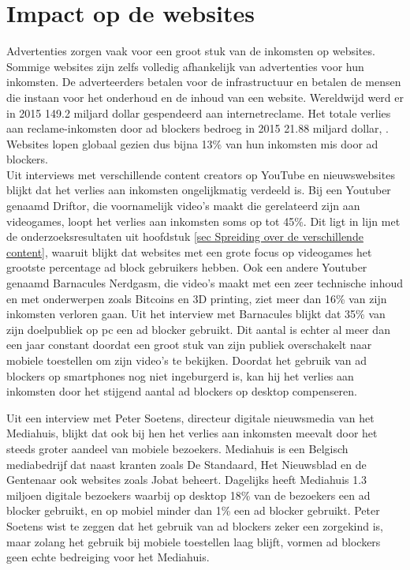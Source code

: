 \documentclass[pdftex,a4paper,12pt,twoside]{report}
\begin{document}
\section{Impact op de websites}
\label{sec:Impact op de webpagina's}
Advertenties zorgen vaak voor een groot stuk van de inkomsten op websites. Sommige websites zijn zelfs volledig afhankelijk van advertenties voor hun inkomsten. De adverteerders betalen voor de infrastructuur en betalen de mensen die instaan voor het onderhoud en de inhoud van een website. Wereldwijd werd er in 2015 149.2 miljard dollar gespendeerd aan internetreclame. Het totale verlies aan reclame-inkomsten door ad blockers bedroeg in 2015 21.88 miljard dollar, \cite{PageFair2015}. Websites lopen globaal gezien dus bijna 13\% van hun inkomsten mis door ad blockers. 
\\
Uit interviews met verschillende content creators op YouTube en nieuwswebsites blijkt dat het verlies aan inkomsten ongelijkmatig verdeeld is. Bij een Youtuber genaamd Driftor, die voornamelijk video's maakt die gerelateerd zijn aan videogames, loopt het verlies aan inkomsten soms op tot 45\%. Dit ligt in lijn met de onderzoeksresultaten uit hoofdstuk \ref{sec Spreiding over de verschillende content}, waaruit blijkt dat websites met een grote focus op videogames het grootste percentage ad block gebruikers hebben. 
Ook een andere Youtuber genaamd Barnacules Nerdgasm, die video's maakt met een zeer technische inhoud en met onderwerpen zoals Bitcoins en 3D printing, ziet meer dan 16\% van zijn inkomsten verloren gaan. Uit het interview met Barnacules blijkt dat 35\% van zijn doelpubliek op pc een ad blocker gebruikt. Dit aantal  is echter al meer dan een jaar constant doordat een groot stuk van zijn publiek overschakelt naar mobiele toestellen om zijn video's te bekijken. Doordat het gebruik van ad blockers op smartphones nog niet ingeburgerd is, kan hij het verlies aan inkomsten door het stijgend aantal ad blockers op desktop compenseren.

Uit een interview met Peter Soetens, directeur digitale nieuwsmedia van het Mediahuis, blijkt dat ook bij hen het verlies aan inkomsten meevalt door het steeds groter aandeel van mobiele bezoekers. Mediahuis is een Belgisch mediabedrijf dat naast kranten zoals De Standaard, Het Nieuwsblad en de Gentenaar ook websites zoals Jobat beheert. Dagelijks heeft Mediahuis 1.3 miljoen digitale bezoekers waarbij op desktop 18\% van de bezoekers een ad blocker gebruikt, en op mobiel minder dan 1\% een ad blocker gebruikt. Peter Soetens wist te zeggen dat het gebruik van ad blockers zeker een zorgekind is, maar zolang het gebruik bij mobiele toestellen laag blijft, vormen ad blockers geen echte bedreiging voor het Mediahuis.
\end{document}
